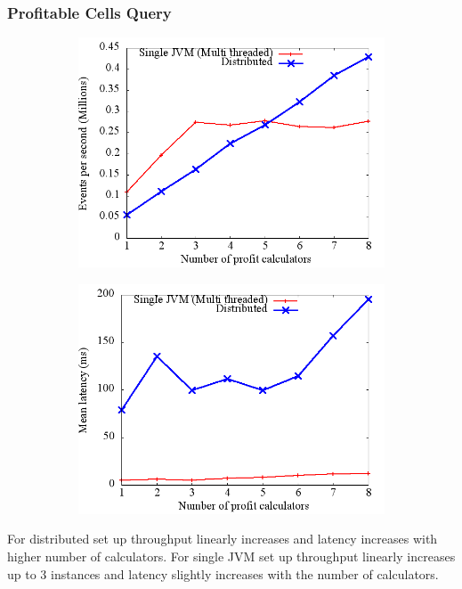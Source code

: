 \documentclass{beamer}
\begin{document}
\begin{frame}
\frametitle{Profitable Cells Query}

\begin{figure}
        \centering
        \begin{subfigure}[b]{0.45\textwidth}
                \includegraphics[width=\textwidth]{throughput_profit.png}
        \end{subfigure}
        \begin{subfigure}[b]{0.45\textwidth}
                \includegraphics[width=\textwidth]{latency_profit.png}
        \end{subfigure}
\end{figure}

\footnotesize For distributed set up throughput linearly increases and latency increases with higher number of calculators. For single JVM set up throughput linearly increases up to 3 instances and latency slightly increases with the number of calculators. 

\end{frame}
\end{document}
